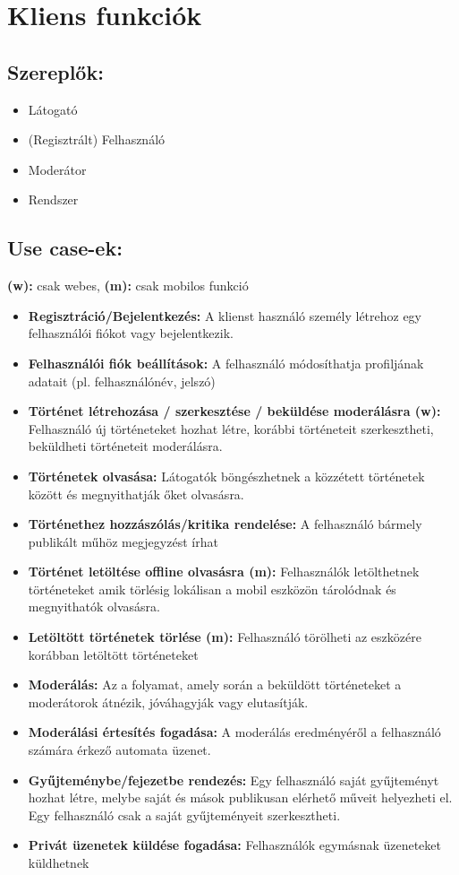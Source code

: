 \section{Kliens funkciók}

\subsection{Szereplők:}
\begin{itemize}
\item Látogató
\item (Regisztrált) Felhasználó
\item Moderátor
\item Rendszer
\end{itemize}

\subsection{Use case-ek:}
\textbf{(w):} csak webes, \textbf{(m):} csak mobilos funkció
\begin{itemize}
\item \textbf{Regisztráció/Bejelentkezés:} A klienst használó személy létrehoz egy felhasználói fiókot vagy bejelentkezik.
\item \textbf{Felhasználói fiók beállítások:} A felhasználó módosíthatja profiljának adatait (pl. felhasználónév, jelszó)
\item \textbf{Történet létrehozása / szerkesztése / beküldése moderálásra (w):} Felhasználó új történeteket hozhat létre, korábbi történeteit szerkesztheti, beküldheti történeteit moderálásra.
\item \textbf{Történetek olvasása:} Látogatók böngészhetnek a közzétett történetek között és megnyithatják őket olvasásra.
\item \textbf{Történethez hozzászólás/kritika rendelése:} A felhasználó bármely publikált műhöz megjegyzést írhat
\item \textbf{Történet letöltése offline olvasásra (m):} Felhasználók letölthetnek történeteket amik törlésig lokálisan a mobil eszközön tárolódnak és megnyithatók olvasásra.  
\item \textbf{Letöltött történetek törlése (m):} Felhasználó törölheti az eszközére korábban letöltött történeteket
\item \textbf{Moderálás:} Az a folyamat, amely során a beküldött történeteket a moderátorok átnézik, jóváhagyják vagy elutasítják. 
\item \textbf{Moderálási értesítés fogadása:} A moderálás eredményéről a felhasználó számára érkező automata üzenet.
\item \textbf{Gyűjteménybe/fejezetbe rendezés:} Egy felhasználó saját gyűjteményt hozhat létre, melybe saját és mások publikusan elérhető műveit helyezheti el. Egy felhasználó csak a saját gyűjteményeit szerkesztheti. 
\item \textbf{Privát üzenetek küldése fogadása:} Felhasználók egymásnak üzeneteket küldhetnek
\end{itemize}
